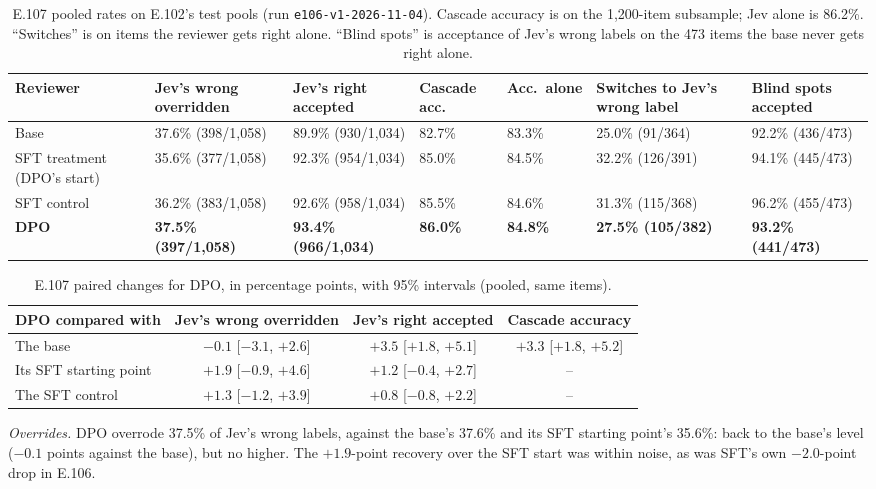 \documentclass[11pt]{article}
\renewcommand{\_}{\origunderscore\allowbreak}
\begin{document}
\begin{table}[H]
\centering
\small
\caption{E.107 pooled rates on E.102's test pools (run \texttt{e106-v1-2026-11-04}). Cascade accuracy is on the 1{,}200-item subsample; Jev alone is 86.2\%. ``Switches'' is on items the reviewer gets right alone. ``Blind spots'' is acceptance of Jev's wrong labels on the 473 items the base never gets right alone.}
\label{tab:e107-pooled}
\begin{tabularx}{\textwidth}{>{\raggedright\arraybackslash}p{2.6cm}XXp{1.3cm}p{1.2cm}XX}
\toprule
Reviewer & Jev's wrong overridden & Jev's right accepted & Cascade acc. & Acc.\ alone & Switches to Jev's wrong label & Blind spots accepted \\
\midrule
Base & 37.6\% (398/1{,}058) & 89.9\% (930/1{,}034) & 82.7\% & 83.3\% & 25.0\% (91/364) & 92.2\% (436/473) \\
SFT treatment (DPO's start) & 35.6\% (377/1{,}058) & 92.3\% (954/1{,}034) & 85.0\% & 84.5\% & 32.2\% (126/391) & 94.1\% (445/473) \\
SFT control & 36.2\% (383/1{,}058) & 92.6\% (958/1{,}034) & 85.5\% & 84.6\% & 31.3\% (115/368) & 96.2\% (455/473) \\
\textbf{DPO} & \textbf{37.5\% (397/1{,}058)} & \textbf{93.4\% (966/1{,}034)} & \textbf{86.0\%} & \textbf{84.8\%} & \textbf{27.5\% (105/382)} & \textbf{93.2\% (441/473)} \\
\bottomrule
\end{tabularx}
\end{table}

\begin{table}[H]
\centering
\small
\caption{E.107 paired changes for DPO, in percentage points, with 95\% intervals (pooled, same items).}
\label{tab:e107-paired}
\begin{tabular}{lccc}
\toprule
DPO compared with & Jev's wrong overridden & Jev's right accepted & Cascade accuracy \\
\midrule
The base & $-0.1$ [$-3.1$, $+2.6$] & $+3.5$ [$+1.8$, $+5.1$] & $+3.3$ [$+1.8$, $+5.2$] \\
Its SFT starting point & $+1.9$ [$-0.9$, $+4.6$] & $+1.2$ [$-0.4$, $+2.7$] & -- \\
The SFT control & $+1.3$ [$-1.2$, $+3.9$] & $+0.8$ [$-0.8$, $+2.2$] & -- \\
\bottomrule
\end{tabular}
\end{table}

\emph{Overrides.} DPO overrode 37.5\% of Jev's wrong labels, against the base's 37.6\% and its SFT starting point's 35.6\%: back to the base's level ($-0.1$ points against the base), but no higher. The $+1.9$-point recovery over the SFT start was within noise, as was SFT's own $-2.0$-point drop in E.106.
\end{document}
